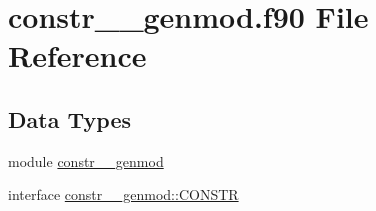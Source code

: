\hypertarget{constr____genmod_8f90}{\section{constr\+\_\+\+\_\+genmod.\+f90 File Reference}
\label{constr____genmod_8f90}
}
\subsection*{Data Types}
\begin{DoxyCompactItemize}
\item 
module \hyperlink{classconstr____genmod}{constr\+\_\+\+\_\+genmod}
\item 
interface \hyperlink{interfaceconstr____genmod_1_1CONSTR}{constr\+\_\+\+\_\+genmod\+::\+C\+O\+N\+S\+T\+R}
\end{DoxyCompactItemize}

